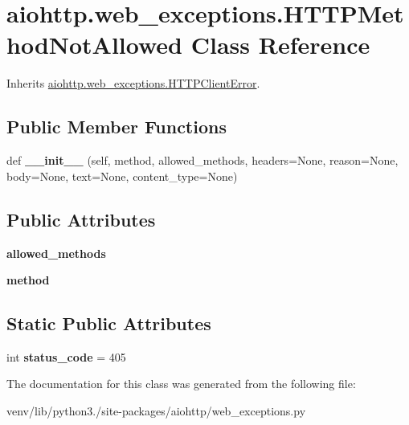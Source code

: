 \hypertarget{classaiohttp_1_1web__exceptions_1_1_h_t_t_p_method_not_allowed}{}\section{aiohttp.\+web\+\_\+exceptions.\+H\+T\+T\+P\+Method\+Not\+Allowed Class Reference}
\label{classaiohttp_1_1web__exceptions_1_1_h_t_t_p_method_not_allowed}


Inherits \hyperlink{classaiohttp_1_1web__exceptions_1_1_h_t_t_p_client_error}{aiohttp.\+web\+\_\+exceptions.\+H\+T\+T\+P\+Client\+Error}.

\subsection*{Public Member Functions}
\begin{DoxyCompactItemize}
\item 
\mbox{\label{classaiohttp_1_1web__exceptions_1_1_h_t_t_p_method_not_allowed_a57c6648d3b6d4e93b8ea3c17e352e946}} 
def {\bfseries \+\_\+\+\_\+init\+\_\+\+\_\+} (self, method, allowed\+\_\+methods, headers=None, reason=None, body=None, text=None, content\+\_\+type=None)
\end{DoxyCompactItemize}
\subsection*{Public Attributes}
\begin{DoxyCompactItemize}
\item 
\mbox{\label{classaiohttp_1_1web__exceptions_1_1_h_t_t_p_method_not_allowed_a260d0e2da1be55610fc723af66ac5a33}} 
{\bfseries allowed\+\_\+methods}
\item 
\mbox{\label{classaiohttp_1_1web__exceptions_1_1_h_t_t_p_method_not_allowed_ad823154514df10ece4ab03d2433a7f1b}} 
{\bfseries method}
\end{DoxyCompactItemize}
\subsection*{Static Public Attributes}
\begin{DoxyCompactItemize}
\item 
\mbox{\label{classaiohttp_1_1web__exceptions_1_1_h_t_t_p_method_not_allowed_a243bad8315924d5859220e2252de533f}} 
int {\bfseries status\+\_\+code} = 405
\end{DoxyCompactItemize}


The documentation for this class was generated from the following file\+:\begin{DoxyCompactItemize}
\item 
venv/lib/python3./site-\/packages/aiohttp/web\+\_\+exceptions.\+py\end{DoxyCompactItemize}
